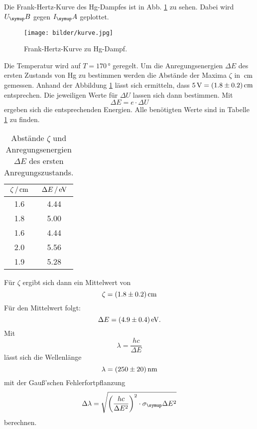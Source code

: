 Die Frank-Hertz-Kurve des Hg-Dampfes ist in Abb. \ref{fig:kurve} zu sehen.
Dabei wird $U_\su{B}$ gegen $I_\su{A}$ geplottet.
\begin{figure}
  \centering
  \texttt{[image: bilder/kurve.jpg]}
  \caption{Frank-Hertz-Kurve zu Hg-Dampf.}
  \label{fig:kurve}
\end{figure}
Die Temperatur wird auf $T=170\,\si{\degree}$ geregelt. Um die Anregungsenergien
$\Delta E$
des ersten Zustands von Hg zu bestimmen werden die Abstände der Maxima $\zeta$ in
$\,\si{\centi\meter}$ gemessen. Anhand der Abbildung \ref{fig:kurve} lässt sich ermitteln,
dass $5\,\si{\volt} = (1.8\pm0.2)\,\si{\centi\meter}$ entsprechen. Die jeweiligen Werte für $\Delta U$
lassen sich dann bestimmen. Mit
\begin{equation}
  \Delta E = e\cdot \Delta U
\end{equation}
ergeben sich die entsprechenden Energien. Alle benötigten Werte sind in Tabelle
\ref{tab:werte} zu finden.
\begin{table}
  \centering
  \begin{tabular}{c c}
    \toprule
    $\zeta \,/\,\si{\centi\meter}$   & $\Delta E \,/\,\si{\electronvolt}$  \\
    \midrule
    1.6 & 4.44 \\
    1.8 & 5.00 \\
    1.6 & 4.44 \\
    2.0 & 5.56 \\
    1.9 & 5.28 \\
    \bottomrule
  \end{tabular}
  \caption{Abstände $\zeta$ und Anregungsenergien $\Delta E$ des ersten Anregungszustands.}
  \label{tab:werte}
\end{table}
Für $\zeta$ ergibt sich dann ein Mittelwert von
\begin{equation*}
  \zeta = (1.8\pm0.2)\,\si{\centi\meter}
\end{equation*}
Für den Mittelwert folgt:
\begin{equation*}
  \Delta E = (4.9 \pm 0.4) \,\si{\electronvolt}.
\end{equation*}
Mit
\begin{equation}
  \lambda = \frac{hc}{\Delta E} \label{eqn:lambda}
\end{equation}
lässt sich die Wellenlänge
\begin{equation*}
  \lambda = (250 \pm 20)\,\si{\nano\meter}
\end{equation*}
mit der Gauß'schen Fehlerfortpflanzung
\begin{equation*}
  \Delta\lambda=\sqrt{\left(\frac{hc}{\Delta E^2}\right)^2\cdot\sigma_\su{\Delta E^2}}
\end{equation*}
berechnen.


